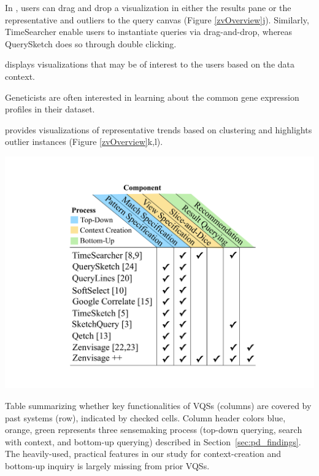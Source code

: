   \item
  \item
\enumend
\featurelist
  \item In \zvpp, users can drag and drop a visualization in either the results pane or the representative and outliers to the query canvas (Figure \ref{zvOverview}j). Similarly, TimeSearcher enable users to instantiate queries via drag-and-drop, whereas QuerySketch does so through double clicking.
  \item
\enumend
 displays visualizations that may be of interest to the users based on the data context.
\problemlist
  \item Geneticists are often interested in learning about the common gene expression profiles in their dataset.
\enumend
\featurelist
  \item \zvpp provides visualizations of representative trends based on clustering and highlights outlier instances (Figure \ref{zvOverview}k,l).%
\enumend
\begin{table}
		\centering
    \includegraphics[width=0.8\linewidth]{figures/related_works_table.pdf}
    \caption{Table summarizing whether key functionalities of VQSs (columns) are covered by past systems (row), indicated by checked cells. Column header colors blue, orange, green represents three sensemaking process (top-down querying, search with context, and bottom-up querying) described in Section~\ref{sec:pd_findings}. The heavily-used, practical features in our study for context-creation and bottom-up inquiry is largely missing from prior VQSs.}
    \label{table:relatedwork}
    \vspace{-10pt}
\end{table}
